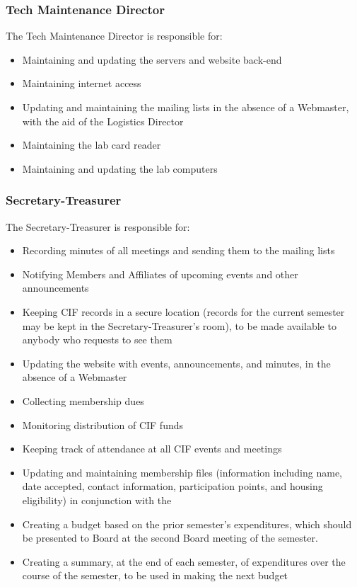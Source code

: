 		\subsubsection {Tech Maintenance Director}



The Tech Maintenance Director is responsible for:
\begin{itemize}
	\item Maintaining and updating the servers and website back-end
	\item Maintaining internet access
	\item Updating and maintaining the mailing lists in the absence of a Webmaster, with the aid of the Logistics Director
	\item Maintaining the lab card reader
	\item Maintaining and updating the lab computers
\end{itemize}



		\subsubsection {Secretary-Treasurer}

The Secretary-Treasurer is responsible for:
\begin{itemize}
	\item Recording minutes of all meetings and sending them to the mailing lists
	\item Notifying Members and Affiliates of upcoming events and other announcements
	\item Keeping CIF records in a secure location (records for the current semester may be kept in the Secretary-Treasurer's room), to be made available to anybody who requests to see them
	\item Updating the website with events, announcements, and minutes, in the absence of a Webmaster
	\item Collecting membership dues
	\item Monitoring distribution of CIF funds
	\item Keeping track of attendance at all CIF events and meetings
	\item Updating and maintaining membership files (information including name, date accepted, contact information, participation points, and housing eligibility) in conjunction with the
	\item Creating a budget based on the prior semester's expenditures, which should be presented to Board at the second Board meeting of the semester.
	\item Creating a summary, at the end of each semester, of expenditures over the course of the semester, to be used in making the next budget
\end{itemize}



